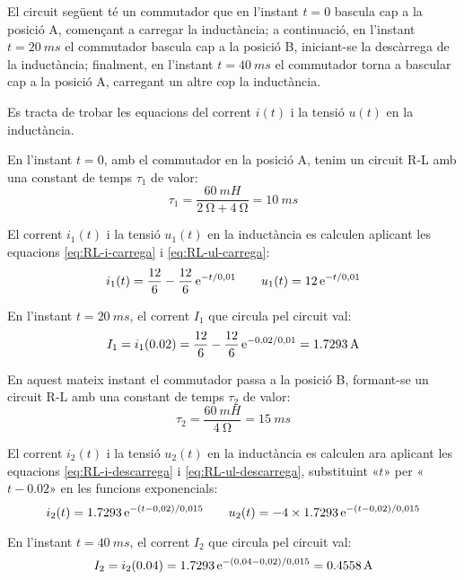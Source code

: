 \begin{exemple}\label{ex:carrega-descarrega-RL}
    El circuit següent té un commutador que en l'instant $t=0$ bascula cap a la posició A, començant a carregar la inductància; a continuació, en l'instant $t=\SI{20}{ms}$ el commutador bascula cap a la posició B, iniciant-se la descàrrega de la inductància; finalment, en  l'instant $t=\SI{40}{ms}$ el commutador torna a  bascular cap a la posició A, carregant un altre cop la inductància.

    Es tracta de trobar les equacions del corrent $i(t)$ i la tensió $u(t)$ en la inductància.

    \begin{center}
        
    \end{center}

    En l'instant $t=0$, amb el commutador en la posició A, tenim un circuit R-L amb una constant de temps $\tau_1$ de valor:
    \[
        \tau_1 = \frac{\SI{60}{mH}}{\SI{2}{\ohm}+\SI{4}{\ohm}} = \SI{10}{ms}
    \]

    El corrent $i_1(t)$ i la tensió $u_1(t)$ en la inductància es calculen aplicant les equacions \eqref{eq:RL-i-carrega} i \eqref{eq:RL-ul-carrega}:
    \[
        i_1(t) = \frac{12}{6} - \frac{12}{6}\,\mathrm{e}^{-t/0,01} \qquad
        u_1(t) = 12\,\mathrm{e}^{-t/0,01}
    \]

    En l'instant $t=\SI{20}{ms}$, el corrent $I_1$ que circula pel circuit val:
    \[
        I_1 = i_1(\num{0,02}) = \frac{12}{6} - \frac{12}{6}\,\mathrm{e}^{-0,02/0,01} = \SI{1,7293}{A}
    \]

    En aquest mateix instant  el commutador passa a la posició B, formant-se un circuit R-L amb una constant de temps $\tau_2$ de valor:
    \[
        \tau_2 = \frac{\SI{60}{mH}}{\SI{4}{\ohm}} = \SI{15}{ms}
    \]

    El corrent $i_2(t)$ i la tensió $u_2(t)$ en la inductància es calculen ara aplicant les equacions \eqref{eq:RL-i-descarrega} i \eqref{eq:RL-ul-descarrega}, substituint «$t$» per «$t-\num{0,02}$» en les funcions exponencials:
    \[
        i_2(t) = \num{1,7293}\,\mathrm{e}^{-(t-0,02)/0,015} \qquad
        u_2(t) = -4\times\num{1,7293}\,\mathrm{e}^{-(t-0,02)/0,015}
    \]

    En l'instant $t=\SI{40}{ms}$, el corrent $I_2$ que circula pel circuit val:
    \[
        I_2 = i_2(\num{0,04}) = \num{1,7293}\,\mathrm{e}^{-(0,04-0,02)/0,015} = \SI{0,4558}{A}
    \]


\end{exemple}
